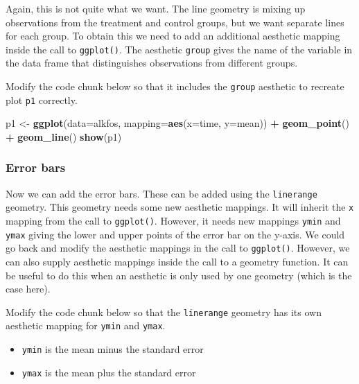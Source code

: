 \documentclass[
]{book}
\newenvironment{Shaded}{\begin{snugshade}}{\end{snugshade}}
\newcommand{\AttributeTok}[1]{\textcolor[rgb]{0.13,0.29,0.53}{#1}}
\newcommand{\FunctionTok}[1]{\textcolor[rgb]{0.13,0.29,0.53}{\textbf{#1}}}
\newcommand{\NormalTok}[1]{#1}
\newcommand{\OtherTok}[1]{\textcolor[rgb]{0.56,0.35,0.01}{#1}}
\newcommand{\SpecialCharTok}[1]{\textcolor[rgb]{0.81,0.36,0.00}{\textbf{#1}}}
\providecommand{\tightlist}{%
  \setlength{\itemsep}{0pt}\setlength{\parskip}{0pt}}
\begin{document}
Again, this is not quite what we want. The line geometry is mixing up observations from the treatment and control groups, but we want separate lines for each group. To obtain this we need to add an additional aesthetic mapping inside the call to \texttt{ggplot()}. The aesthetic \texttt{group} gives the name of the variable in the data frame that distinguishes observations from different groups.

Modify the code chunk below so that it includes the \texttt{group} aesthetic to recreate plot \texttt{p1} correctly.

\begin{Shaded}
\begin{Highlighting}[]
\NormalTok{p1 }\OtherTok{\textless{}{-}} \FunctionTok{ggplot}\NormalTok{(}\AttributeTok{data=}\NormalTok{alkfos, }\AttributeTok{mapping=}\FunctionTok{aes}\NormalTok{(}\AttributeTok{x=}\NormalTok{time, }\AttributeTok{y=}\NormalTok{mean)) }\SpecialCharTok{+}
  \FunctionTok{geom\_point}\NormalTok{() }\SpecialCharTok{+} \FunctionTok{geom\_line}\NormalTok{()}
\FunctionTok{show}\NormalTok{(p1)}
\end{Highlighting}
\end{Shaded}

\subsubsection{Error bars}\label{error-bars}

Now we can add the error bars. These can be added using the \texttt{linerange} geometry. This geometry needs some new aesthetic mappings. It will inherit the \texttt{x} mapping from the call to \texttt{ggplot()}. However, it needs new mappings \texttt{ymin} and \texttt{ymax} giving the lower and upper points of the error bar on the y-axis. We could go back and modify the aesthetic mappings in the call to \texttt{ggplot()}. However, we can also supply aesthetic mappings inside the call to a geometry function. It can be useful to do this when an aesthetic is only used by one geometry (which is the case here).

Modify the code chunk below so that the \texttt{linerange} geometry has its own aesthetic mapping for \texttt{ymin} and \texttt{ymax}.

\begin{itemize}
\tightlist
\item
  \texttt{ymin} is the mean minus the standard error
\item
  \texttt{ymax} is the mean plus the standard error
\end{itemize}
\end{document}
